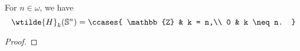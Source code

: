\begin{proposition}
	For $n \in \omega$, we have
	\begin{equation*}
		\wtilde{H}_k(\mathbb{S}^n) = \ccases{
			\mathbb{Z} & k = n,\\
			0 & k \neq n.
		}
	\end{equation*} 
\end{proposition}

\begin{proof}
	
\end{proof}

